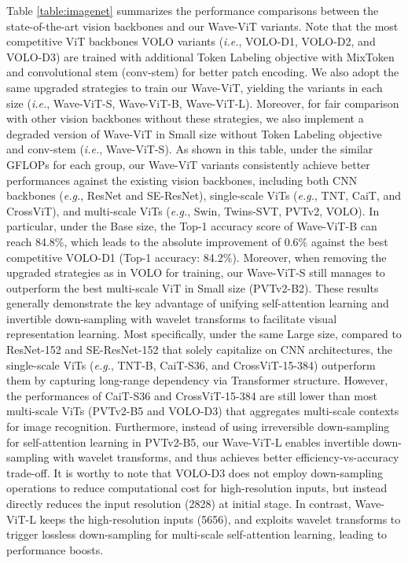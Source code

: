 \documentclass[runningheads]{llncs}
\begin{document}
Table \ref{table:imagenet} summarizes the performance comparisons between the state-of-the-art vision backbones and our Wave-ViT variants. Note that the most competitive ViT backbones VOLO variants (\emph{i.e.}, VOLO-D1, VOLO-D2, and VOLO-D3) are trained with additional Token Labeling objective with MixToken \cite{jiang2021all} and convolutional stem (conv-stem) \cite{wang2021scaled} for better patch encoding. We also adopt the same upgraded strategies to train our Wave-ViT, yielding the variants in each size (\emph{i.e.}, Wave-ViT-S, Wave-ViT-B, Wave-ViT-L). Moreover, for fair comparison with other vision backbones without these strategies, we also implement a degraded version of Wave-ViT in Small size without Token Labeling objective and conv-stem (\emph{i.e.}, Wave-ViT-S). As shown in this table, under the similar GFLOPs for each group, our Wave-ViT variants consistently achieve better performances against the existing vision backbones, including both CNN backbones (\emph{e.g.}, ResNet and SE-ResNet), single-scale ViTs (\emph{e.g.}, TNT, CaiT, and CrossViT), and multi-scale ViTs (\emph{e.g.}, Swin, Twins-SVT, PVTv2, VOLO). In particular, under the Base size, the Top-1 accuracy score of Wave-ViT-B can reach 84.8\%, which leads to the absolute improvement of 0.6\% against the best competitive VOLO-D1 (Top-1 accuracy: 84.2\%). Moreover, when removing the upgraded strategies as in VOLO for training, our Wave-ViT-S still manages to outperform the best multi-scale ViT in Small size (PVTv2-B2). These results generally demonstrate the key advantage of unifying self-attention learning and invertible down-sampling with wavelet transforms to facilitate visual representation learning. Most specifically, under the same Large size, compared to ResNet-152 and SE-ResNet-152 that solely capitalize on CNN architectures, the single-scale ViTs (\emph{e.g.}, TNT-B, CaiT-S36, and CrossViT-15-384) outperform them by capturing long-range dependency via Transformer structure. However, the performances of CaiT-S36 and CrossViT-15-384 are still lower than most multi-scale ViTs (PVTv2-B5 and VOLO-D3) that aggregates multi-scale contexts for image recognition. Furthermore, instead of using irreversible down-sampling for self-attention learning in PVTv2-B5, our Wave-ViT-L enables invertible down-sampling with wavelet transforms, and thus achieves better efficiency-vs-accuracy trade-off. It is worthy to note that VOLO-D3 does not employ down-sampling operations to reduce computational cost for high-resolution inputs, but instead directly reduces the input resolution (2828) at initial stage. In contrast, Wave-ViT-L keeps the high-resolution inputs (5656), and exploits wavelet transforms to trigger lossless down-sampling for multi-scale self-attention learning, leading to performance boosts.
\end{document}
